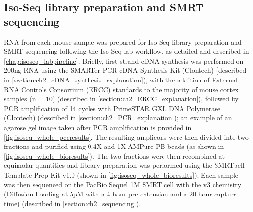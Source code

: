 \subsection{Iso-Seq library preparation and SMRT sequencing}\label{ch4_methods: isoseq_library}
RNA from each mouse sample was prepared for Iso-Seq library preparation and SMRT sequencing following the Iso-Seq lab workflow, as detailed and described in \cref{chap:isoseq_labpipeline}. Briefly, first-strand cDNA synthesis was performed on 200ng RNA using the SMARTer PCR cDNA Synthesis Kit (Clontech) (described in \cref{section:ch2_cDNA_synthesis_explanation}), with the addition of External RNA Controls Consortium (ERCC) standards to the majority of mouse cortex samples (n = 10) (described in \cref{section:ch2_ERCC_explanation}), followed by PCR amplification of 14 cycles with PrimeSTAR GXL DNA Polymerase (Clontech) (described in \cref{section:ch2_PCR_explanation}); an example of an agarose gel image taken after PCR amplification is provided in \cref{fig:isoseq_whole_pccresults}. The resulting amplicons were then divided into two fractions and purified using 0.4X and 1X AMPure PB beads (as shown in \cref{fig:isoseq_whole_bioresults}). The two fractions were then recombined at equimolar quantities and library preparation was performed using the SMRTbell Template Prep Kit v1.0 (shown in \cref{fig:isoseq_whole_bioresults}). Each sample was then sequenced on the PacBio Sequel 1M SMRT cell with the v3 chemistry (Diffusion Loading at 5pM with a 4-hour pre-extension and a 20-hour capture time) (described in \cref{section:ch2_sequencing}).

